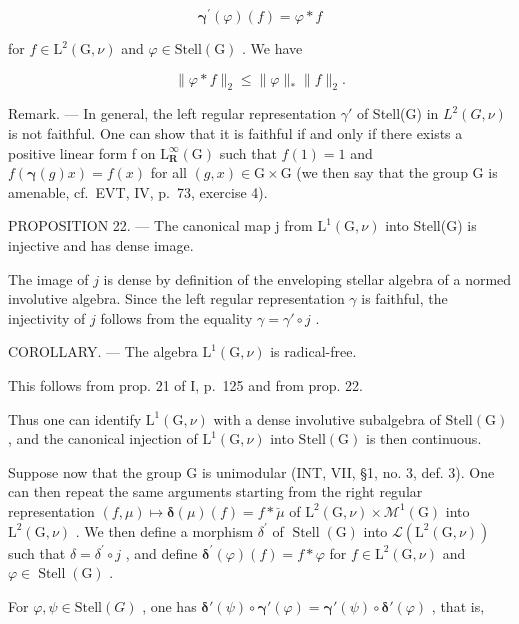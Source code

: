 \[
\boldsymbol {\gamma} ^ {\prime} (\varphi) (f) = \varphi * f\tag{7}
\]

for \(f\in \mathrm{L}^2 (\mathrm{G},\nu)\) and \(\varphi \in \mathrm{Stell}(\mathrm{G})\) . We have

\[
\| \varphi * f \| _ {2} \leqslant \| \varphi \| _ {*} \| f \| _ {2}.\tag{8}
\]

Remark. --- In general, the left regular representation \(\gamma'\) of Stell(G) in \(L^{2}(G,\nu)\) is not faithful. One can show that it is faithful if and only if there exists a positive linear form f on \(\mathrm{L}_{\mathbf{R}}^{\infty}(\mathrm{G})\) such that \(f(1)=1\) and \(f(\boldsymbol{\gamma}(g)x)=f(x)\) for all \((g,x)\in\mathrm{G}\times\mathrm{G}\) (we then say that the group G is amenable, cf.~EVT, IV, p.~73, exercise 4).

PROPOSITION 22. --- The canonical map j from \(\mathrm{L}^{1}(\mathrm{G},\nu)\) into Stell(G) is injective and has dense image.

The image of \(j\) is dense by definition of the enveloping stellar algebra of a normed involutive algebra. Since the left regular representation \(\gamma\) is faithful, the injectivity of \(j\) follows from the equality \(\gamma = \gamma' \circ j\) .

COROLLARY. --- The algebra \(\mathrm{L}^{1}(\mathrm{G},\nu)\) is radical-free.

This follows from prop. 21 of I, p.~125 and from prop. 22.

Thus one can identify \(\mathrm{L}^{1}(\mathrm{G},\nu)\) with a dense involutive subalgebra of \(\mathrm{Stell}(\mathrm{G})\) , and the canonical injection of \(\mathrm{L}^{1}(\mathrm{G},\nu)\) into \(\mathrm{Stell}(\mathrm{G})\) is then continuous.

Suppose now that the group G is unimodular (INT, VII, §1, no. 3, def. 3). One can then repeat the same arguments starting from the right regular representation \((f,\mu)\mapsto\boldsymbol{\delta}(\mu)(f)=f*\breve{\mu}\) of \(\mathrm{L}^{2}(\mathrm{G},\nu)\times\mathcal{M}^{1}(\mathrm{G})\) into \(\mathrm{L}^{2}(\mathrm{G},\nu)\) . We then define a morphism \(\delta^{\prime}\) of \(\operatorname{Stell}(\mathrm{G})\) into \(\mathcal{L}(\mathrm{L}^{2}(\mathrm{G},\nu))\) such that \(\delta=\delta^{\prime}\circ j\) , and define \(\boldsymbol{\delta}^{\prime}(\varphi)(f)=f*\varphi\) for \(f\in\mathrm{L}^{2}(\mathrm{G},\nu)\) and \(\varphi\in\operatorname{Stell}(\mathrm{G})\) .

For \(\varphi, \psi \in \text{Stell}(G)\) , one has \(\boldsymbol{\delta}'(\psi) \circ \boldsymbol{\gamma}'(\varphi) = \boldsymbol{\gamma}'(\psi) \circ \boldsymbol{\delta}'(\varphi)\) , that is,

